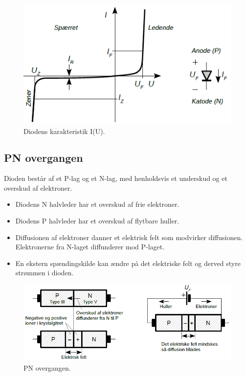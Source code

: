 \documentclass[danish]{article}
\begin{document}
\begin{figure} [H]
	\centering
	\includegraphics[width=0.85\linewidth]{graphics/I-U_karakteristik}
	\caption{Diodens karakteristik I(U).}
	\label{fig:I-U_karakteristik}
\end{figure}


\subsection{PN overgangen}
Dioden består af et P-lag og et N-lag, med henholdsvis et underskud og et overskud af elektroner.
\begin{itemize}
	\item Diodens N halvleder har et overskud af frie elektroner.
	\item Diodens P halvleder har et overskud af flytbare huller. 
	\item Diffusionen af elektroner danner et elektrisk felt som modvirker diffusionen. Elektronerne fra N-laget diffunderer mod P-laget.
	\item En ekstern spændingskilde kan ændre på det elektriske felt og derved styre strømmen i dioden.
\end{itemize}

\begin{figure} [H]
	\centering
	\includegraphics[width=\linewidth]{graphics/PN_overgang}
	\caption{PN overgangen.}
	\label{fig:pnovergang}
\end{figure}
\end{document}

